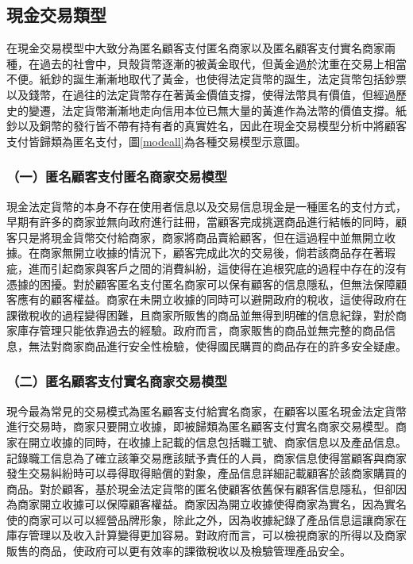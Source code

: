 	\subsection{現金交易類型}
	在現金交易模型中大致分為匿名顧客支付匿名商家以及匿名顧客支付實名商家兩種，在過去的社會中，貝殼貨幣逐漸的被黃金取代，但黃金過於沈重在交易上相當不便。紙鈔的誕生漸漸地取代了黃金，也使得法定貨幣的誕生，法定貨幣包括鈔票以及錢幣，在過往的法定貨幣存在著黃金價值支撐，使得法幣具有價值，但經過歷史的變遷，法定貨幣漸漸地走向信用本位已無大量的黃進作為法幣的價值支撐。紙鈔以及銅幣的發行皆不帶有持有者的真實姓名，因此在現金交易模型分析中將顧客支付皆歸類為匿名支付，圖\ref{modeall}為各種交易模型示意圖。

		\subsubsection{（一）匿名顧客支付匿名商家交易模型}
		現金法定貨幣的本身不存在使用者信息以及交易信息現金是一種匿名的支付方式，早期有許多的商家並無向政府進行註冊，當顧客完成挑選商品進行結帳的同時，顧客只是將現金貨幣交付給商家，商家將商品賣給顧客，但在這過程中並無開立收據。在商家無開立收據的情況下，顧客完成此次的交易後，倘若該商品存在著瑕疵，進而引起商家與客戶之間的消費糾紛，這使得在追根究底的過程中存在的沒有憑據的困擾。對於顧客匿名支付匿名商家可以保有顧客的信息隱私，但無法保障顧客應有的顧客權益。商家在未開立收據的同時可以避開政府的稅收，這使得政府在課徵稅收的過程變得困難，且商家所販售的商品並無得到明確的信息紀錄，對於商家庫存管理只能依靠過去的經驗。政府而言，商家販售的商品並無完整的商品信息，無法對商家商品進行安全性檢驗，使得國民購買的商品存在的許多安全疑慮。

		\subsubsection{（二）匿名顧客支付實名商家交易模型}
		現今最為常見的交易模式為匿名顧客支付給實名商家，在顧客以匿名現金法定貨幣進行交易時，商家只要開立收據，即被歸類為匿名顧客支付實名商家交易模型。商家在開立收據的同時，在收據上記載的信息包括職工號、商家信息以及產品信息。記錄職工信息為了確立該筆交易應該賦予責任的人員，商家信息使得當顧客與商家發生交易糾紛時可以尋得取得賠償的對象，產品信息詳細記載顧客於該商家購買的商品。對於顧客，基於現金法定貨幣的匿名使顧客依舊保有顧客信息隱私，但卻因為商家開立收據可以保障顧客權益。商家因為開立收據使得商家為實名，因為實名使的商家可以可以經營品牌形象，除此之外，因為收據紀錄了產品信息這讓商家在庫存管理以及收入計算變得更加容易。對政府而言，可以檢視商家的所得以及商家販售的商品，使政府可以更有效率的課徵稅收以及檢驗管理產品安全。

